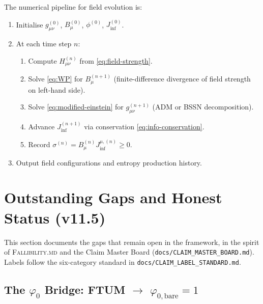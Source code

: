 \documentclass[12pt,a4paper]{article}
\newcommand{\gm}{g_{\mu\nu}}       %
\newcommand{\sigmaS}{\sigma}       %
\begin{document}
The numerical pipeline for field evolution is:
\begin{enumerate}
  \item Initialise $\gm^{(0)}$, $B_\mu^{(0)}$, $\phi^{(0)}$, $J_{\inf}^{(0)}$.
  \item At each time step $n$:
    \begin{enumerate}
      \item Compute $H_{\mu\nu}^{(n)}$ from \eqref{eq:field-strength}.
      \item Solve \eqref{eq:WP} for $B_\mu^{(n+1)}$ (finite-difference
            divergence of field strength on left-hand side).
      \item Solve \eqref{eq:modified-einstein} for $\gm^{(n+1)}$ (ADM
            or BSSN decomposition).
      \item Advance $J_{\inf}^{(n+1)}$ via conservation \eqref{eq:info-conservation}.
      \item Record $\sigmaS^{(n)} = B_\mu^{(n)} J_{\inf}^{\mu,(n)} \ge 0$.
    \end{enumerate}
  \item Output field configurations and entropy production history.
\end{enumerate}

\section*{Outstanding Gaps and Honest Status (v11.5)}

This section documents the gaps that remain open in the framework, in the
spirit of \textsc{Fallibility.md} and the Claim Master Board
(\texttt{docs/CLAIM\_MASTER\_BOARD.md}).  Labels follow the six-category
standard in \texttt{docs/CLAIM\_LABEL\_STANDARD.md}.

\subsection*{The \texorpdfstring{$\varphi_0$}{phi0} Bridge: FTUM $\to$ $\varphi_{0,\text{bare}} = 1$}
\end{document}
